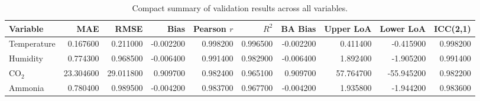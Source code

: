 \begin{table}
\caption{Compact summary of validation results across all variables.}
\label{tab:validation_summary}
\begin{tabular}{lrrrrrrrrr}
\toprule
Variable & MAE & RMSE & Bias & Pearson $r$ & $R^2$ & BA Bias & Upper LoA & Lower LoA & ICC(2,1) \\
\midrule
Temperature & 0.167600 & 0.211000 & -0.002200 & 0.998200 & 0.996500 & -0.002200 & 0.411400 & -0.415900 & 0.998200 \\
Humidity & 0.774300 & 0.968500 & -0.006400 & 0.991400 & 0.982900 & -0.006400 & 1.892400 & -1.905200 & 0.991400 \\
CO$_2$ & 23.304600 & 29.011800 & 0.909700 & 0.982400 & 0.965100 & 0.909700 & 57.764700 & -55.945200 & 0.982200 \\
Ammonia & 0.780400 & 0.989500 & -0.004200 & 0.983700 & 0.967700 & -0.004200 & 1.935800 & -1.944200 & 0.983600 \\
\bottomrule
\end{tabular}
\end{table}
